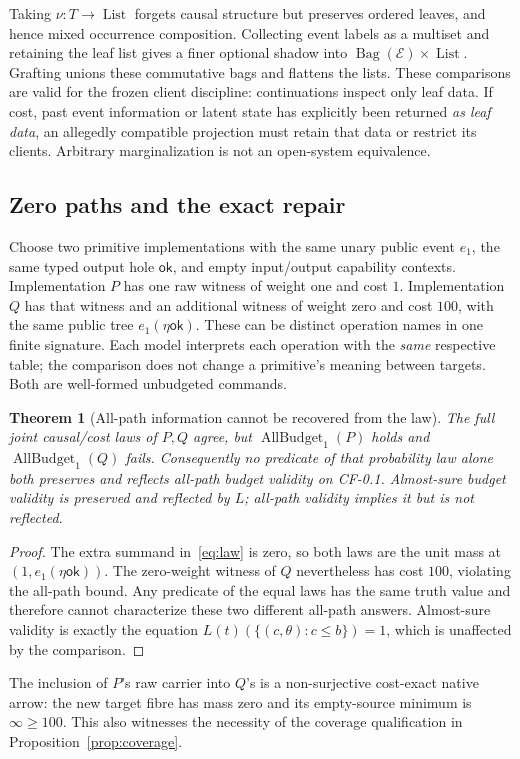 \documentclass[11pt,a4paper]{article}
\newtheorem{theorem}{Theorem}[section]
\theoremstyle{definition}
\newcommand{\List}{\operatorname{List}}
\newcommand{\AllBudget}{\operatorname{AllBudget}}
\begin{document}
Taking $\nu:T\to\List$ forgets causal structure but preserves ordered
leaves, and hence mixed occurrence composition. Collecting event labels
as a multiset and retaining the leaf list gives a finer optional shadow
into $\operatorname{Bag}(\mathcal E)\times\List$. Grafting unions these
commutative bags and flattens the lists. These comparisons are valid for
the frozen client discipline: continuations inspect only leaf data.
If cost, past event information or latent state has explicitly been returned
\emph{as leaf data}, an allegedly compatible projection must retain that
data or restrict its clients. Arbitrary marginalization is not an
open-system equivalence.

\subsection{Zero paths and the exact repair}
Choose two primitive implementations with the same unary public event
$e_1$, the same typed output hole $\mathsf{ok}$, and empty input/output
capability contexts. Implementation $P$ has one raw witness of weight one
and cost $1$. Implementation $Q$ has that witness and an additional witness
of weight zero and cost $100$, with the same public tree
$e_1(\eta\mathsf{ok})$. These can be distinct operation names in one finite
signature. Each model interprets each operation with the \emph{same}
respective table; the comparison does not change a primitive's meaning
between targets. Both are well-formed unbudgeted commands.

\begin{theorem}[All-path information cannot be recovered from the law]
\label{thm:zero-loss}
The full joint causal/cost laws of $P,Q$ agree, but
$\AllBudget_1(P)$ holds and $\AllBudget_1(Q)$ fails. Consequently no predicate
of that probability law alone both preserves and reflects all-path budget
validity on CF-0.1. Almost-sure budget validity is preserved and reflected
by $L$; all-path validity implies it but is not reflected.
\end{theorem}
\begin{proof}
The extra summand in~\eqref{eq:law} is zero, so both laws are the unit mass
at $(1,e_1(\eta\mathsf{ok}))$. The zero-weight witness of $Q$ nevertheless
has cost $100$, violating the all-path bound. Any predicate of the equal
laws has the same truth value and therefore cannot characterize these two
different all-path answers. Almost-sure validity is exactly the equation
$L(t)(\{(c,\theta):c\le b\})=1$, which is unaffected by the comparison.
\end{proof}
The inclusion of $P$'s raw carrier into $Q$'s is a non-surjective cost-exact
native arrow: the new target fibre has mass zero and its empty-source
minimum is $\infty\ge100$. This also witnesses the necessity of the coverage
qualification in Proposition~\ref{prop:coverage}.
\end{document}
